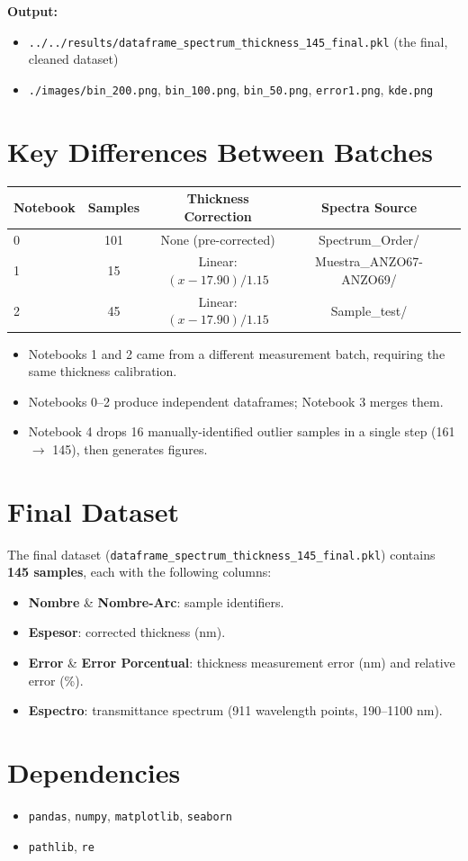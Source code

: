 \documentclass[11pt,a4paper]{article}
\begin{document}
\textbf{Output:}
\begin{itemize}
    \item {\tt ../../results/dataframe\_spectrum\_thickness\_145\_final.pkl} (the final, cleaned dataset)
    \item {\tt ./images/bin\_200.png}, {\tt bin\_100.png}, {\tt bin\_50.png}, {\tt error1.png}, {\tt kde.png}
\end{itemize}

\section{Key Differences Between Batches}

\begin{table}[htbp]
\centering
\begin{tabular}{lcccc}
\toprule
\textbf{Notebook} & \textbf{Samples} & \textbf{Thickness Correction} & \textbf{Spectra Source} \\
\midrule
0 & 101 & None (pre-corrected) & Spectrum\_Order/ \\
1 & 15  & Linear: $(x - 17.90)/1.15$ & Muestra\_ANZO67-ANZO69/ \\
2 & 45  & Linear: $(x - 17.90)/1.15$ & Sample\_test/ \\
\bottomrule
\end{tabular}
\end{table}

\begin{itemize}
    \item Notebooks 1 and 2 came from a different measurement batch, requiring the same thickness calibration.
    \item Notebooks 0--2 produce independent dataframes; Notebook 3 merges them.
    \item Notebook 4 drops 16 manually-identified outlier samples in a single step (161 $\rightarrow$ 145), then generates figures.
\end{itemize}

\section{Final Dataset}

The final dataset ({\tt dataframe\_spectrum\_thickness\_145\_final.pkl}) contains \textbf{145 samples}, each with the following columns:

\begin{itemize}
    \item \textbf{Nombre} \& \textbf{Nombre-Arc}: sample identifiers.
    \item \textbf{Espesor}: corrected thickness (nm).
    \item \textbf{Error} \& \textbf{Error Porcentual}: thickness measurement error (nm) and relative error (\%).
    \item \textbf{Espectro}: transmittance spectrum (911 wavelength points, 190--1100 nm).
\end{itemize}

\section{Dependencies}
\begin{itemize}
    \item {\tt pandas}, {\tt numpy}, {\tt matplotlib}, {\tt seaborn}
    \item {\tt pathlib}, {\tt re}
\end{itemize}
\end{document}
